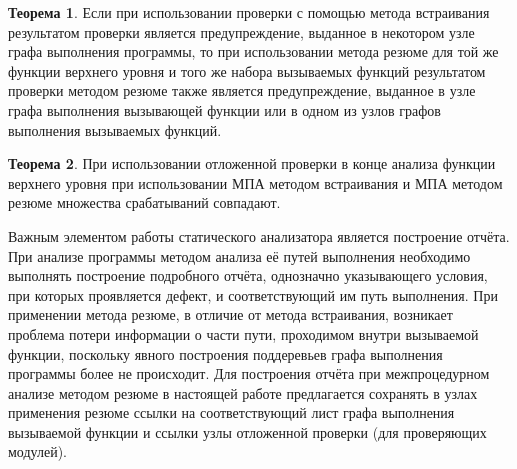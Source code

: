 
\textbf{Теорема 1}. Если при использовании проверки с помощью метода встраивания результатом проверки является предупреждение, выданное в некотором узле графа выполнения программы, то при использовании метода резюме для той же функции верхнего уровня и того же набора вызываемых функций результатом проверки методом резюме также является предупреждение, выданное в узле графа выполнения вызывающей функции или в одном из узлов графов выполнения вызываемых функций.

\textbf{Теорема 2}. При использовании отложенной проверки в конце анализа функции верхнего уровня при использовании МПА методом встраивания и МПА методом резюме множества срабатываний совпадают.

Важным элементом работы статического анализатора является построение отчёта. При анализе программы методом анализа её путей выполнения необходимо выполнять построение подробного отчёта, однозначно указывающего условия, при которых проявляется дефект, и соответствующий им путь выполнения. При применении метода резюме, в отличие от метода встраивания, возникает проблема потери информации о части пути, проходимом внутри вызываемой функции, поскольку явного построения поддеревьев графа выполнения программы более не происходит. Для построения отчёта  при межпроцедурном анализе методом резюме в настоящей работе предлагается сохранять в узлах применения резюме ссылки на соответствующий лист графа выполнения вызываемой функции и ссылки узлы отложенной проверки (для проверяющих модулей).

